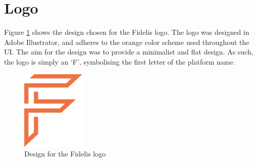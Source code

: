 \section{Logo}
Figure \ref{fig:Logo} shows the design chosen for the Fidelis logo. The logo was designed in Adobe Illustrator, and adheres to the orange color scheme used throughout the UI. The aim for the design was to provide a minimalist and flat design. As such, the logo is simply an `F', symbolising the first letter of the platform name.

\begin{figure}[H]
\centering
\includegraphics[height=1.5in]{Images/Design/Logo}
\caption{Design for the Fidelis logo}
\label{fig:Logo}
\end{figure}